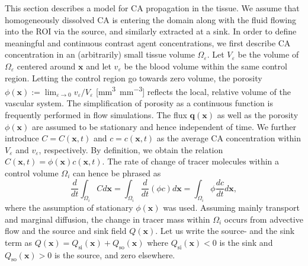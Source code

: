 \documentclass[10pt]{article}
\begin{document}
	This section describes a model for  CA propagation in the tissue. %
	We assume that homogeneously dissolved CA is entering the domain along with the fluid flowing into the ROI via the source, and similarly extracted at a sink.
	In order to define meaningful and continuous contrast agent concentrations, we first describe CA concentration in an (arbitrarily) small tissue volume $\Omega_\varepsilon$.
	Let $V_\varepsilon$ be the volume of $\Omega_\varepsilon$ centered around $\mathbf{x}$ and let $v_\varepsilon$ be the blood volume within the same control region.
	Letting the control region go towards zero volume, the porosity $\phi(\mathbf{x}) :=  \lim_{\varepsilon \to 0} v_\varepsilon/V_\varepsilon$ [\si{\milli\meter\cubed\per\milli\meter\cubed}] reflects the local, relative volume of the vascular system. The simplification of porosity as a continuous function is frequently performed in flow simulations.
	The flux $\mathbf{q}(\mathbf{x})$ as well as the porosity $\phi(\mathbf{x})$ are assumed to be stationary and hence independent of time.	
	We further introduce $C = C(\mathbf{x},t)$ and $c = c(\mathbf{x},t)$ as the average CA concentration within $V_\varepsilon$ and $v_\varepsilon$, respectively.
	By definition, we obtain the relation $C(\mathbf{x},t) = \phi(\mathbf{x})  c(\mathbf{x},t)$.
	The rate of change of tracer molecules within a control volume $\Omega_i$ can hence be phrased as
	\begin{equation}
		\frac{d}{dt} \int_{\Omega_i}C  d \mathbf{x} = \int_{\Omega_i}	\frac{d}{dt} (\phi c) d \mathbf{x} = \int_{\Omega_i} \phi \frac{d c}{dt} d \mathbf{x},
		\label{eq:dmdt}
	\end{equation}	
	where the assumption of stationary $\phi(\mathbf{x})$ was used.
	Assuming mainly transport and marginal diffusion, the change in tracer mass within $\Omega_i$ occurs from advective flow and the source and sink field $Q(\mathbf{x})$.
	Let us write the source- and the sink term as $Q(\mathbf{x}) = Q_{\mathrm{si}}(\mathbf{x}) + Q_{\mathrm{so}}(\mathbf{x})$ where $Q_{\mathrm{si}}(\mathbf{x}) < 0$ is the sink and $Q_{\mathrm{so}}(\mathbf{x}) > 0$ is the source, and zero elsewhere. 
\end{document}
